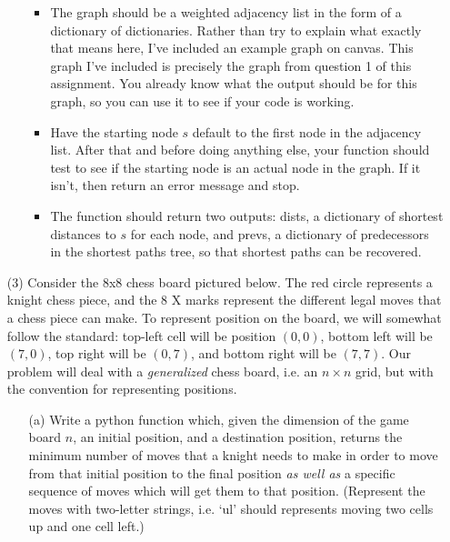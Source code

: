 \documentclass[12pt]{article}
\begin{document}
\begin{enumerate}
\begin{itemize}
\begin{itemize}
            \item The graph should be a weighted adjacency list in the form of a dictionary of dictionaries. Rather than try to explain what exactly that means here, I've included an example graph on canvas. This graph I've included is precisely the graph from question 1 of this assignment. You already know what the output should be for this graph, so you can use it to see if your code is working.
            \item Have the starting node $s$ default to the first node in the adjacency list. After that and before doing anything else, your function should test to see if the starting node is an actual node in the graph. If it isn't, then return an error message and stop.
            \item The function should return two outputs: dists, a dictionary of shortest distances to $s$ for each node, and prevs, a dictionary of predecessors in the shortest paths tree, so that shortest paths can be recovered. 
        \end{itemize} 
    \end{itemize}
    \item[(3)] Consider the 8x8 chess board pictured below. The red circle represents a knight chess piece, and the 8 X marks represent the different legal moves that a chess piece can make. To represent position on the board, we will somewhat follow the standard: top-left cell will be position $(0,0)$, bottom left will be $(7,0)$, top right will be $(0,7)$, and bottom right will be $(7,7)$. Our problem will deal with a \emph{generalized} chess board, i.e. an $n \times n$ grid, but with the convention for representing positions. \par 
    \begin{itemize}
        \item[(a)] Write a python function which, given the dimension of the game board $n$, an initial position, and a destination position, returns the minimum number of moves that a knight needs to make in order to move from that initial position to the final position \emph{as well as} a specific sequence of moves which will get them to that position. (Represent the moves with two-letter strings, i.e. `ul' should represents moving two cells up and one cell left.) \par 
    

\end{itemize}
\end{enumerate}
\end{document}
